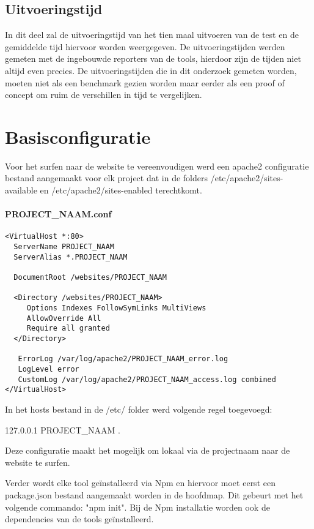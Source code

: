 \subsection{Uitvoeringstijd}
In dit deel zal de uitvoeringstijd van het tien maal uitvoeren van de test en de gemiddelde tijd hiervoor worden weergegeven. De uitvoeringstijden werden gemeten met de ingebouwde reporters van de \glspl{tool}, hierdoor zijn de tijden niet altijd even precies. De uitvoeringstijden die in dit onderzoek gemeten worden, moeten niet als een benchmark gezien worden maar eerder als een proof of concept om ruim de verschillen in tijd te vergelijken.

\clearpage
\section{Basisconfiguratie}
Voor het surfen naar de website te vereenvoudigen werd een apache2 configuratie bestand aangemaakt voor elk project dat in de folders /etc/apache2/sites-available en /etc/apache2/sites-enabled terechtkomt.

\paragraph{PROJECT\_NAAM.conf}
\begin{lstlisting}[breaklines=true]
<VirtualHost *:80>
  ServerName PROJECT_NAAM
  ServerAlias *.PROJECT_NAAM
  
  DocumentRoot /websites/PROJECT_NAAM
  
  <Directory /websites/PROJECT_NAAM>
     Options Indexes FollowSymLinks MultiViews
     AllowOverride All
     Require all granted
  </Directory>
  
   ErrorLog /var/log/apache2/PROJECT_NAAM_error.log
   LogLevel error
   CustomLog /var/log/apache2/PROJECT_NAAM_access.log combined
</VirtualHost>
\end{lstlisting}

In het hosts bestand in de /etc/ folder werd volgende regel toegevoegd: 

127.0.0.1   PROJECT\_NAAM .

Deze configuratie maakt het mogelijk om lokaal via de projectnaam naar de website te surfen.

Verder wordt elke \gls{tool} geïnstalleerd via Npm en hiervoor moet eerst een package.json bestand aangemaakt worden in de hoofdmap. Dit gebeurt met het volgende commando: "npm init". Bij de Npm installatie worden ook de dependencies van de \glspl{tool} geïnstalleerd.

